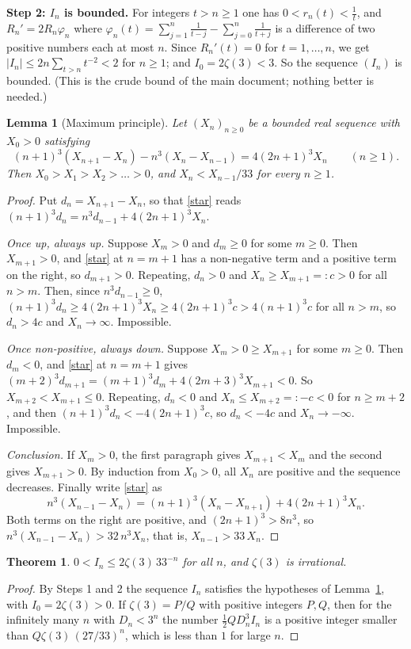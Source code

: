 \documentclass[11pt]{article}
\newtheorem{theorem}{Theorem}
\newtheorem{lemma}{Lemma}
\newcommand{\q}[1]{\medskip\noindent\textbf{#1}}
\begin{document}
\q{Step 2: $I_n$ is bounded.} For integers $t>n\ge1$ one has $0<r_n(t)<\frac1t$, and
$R_n'=2R_n\varphi_n$ where $\varphi_n(t)=\sum_{j=1}^n\frac1{t-j}-\sum_{j=0}^n\frac1{t+j}$ is a
difference of two positive numbers each at most $n$. Since $R_n'(t)=0$ for $t=1,\dots,n$, we get
$|I_n|\le2n\sum_{t>n}t^{-2}<2$ for $n\ge1$; and $I_0=2\zeta(3)<3$. So the sequence $(I_n)$ is
bounded. (This is the crude bound of the main document; nothing better is needed.)

\begin{lemma}[Maximum principle]\label{lem:max}
Let $(X_n)_{n\ge0}$ be a bounded real sequence with $X_0>0$ satisfying
\begin{equation}\label{star}
(n+1)^3(X_{n+1}-X_n)-n^3(X_n-X_{n-1})=4(2n+1)^3X_n\qquad(n\ge1).
\end{equation}
Then $X_0>X_1>X_2>\dots>0$, and $X_n<X_{n-1}/33$ for every $n\ge1$.
\end{lemma}
\begin{proof}
Put $d_n=X_{n+1}-X_n$, so that \eqref{star} reads $(n+1)^3d_n=n^3d_{n-1}+4(2n+1)^3X_n$.

\emph{Once up, always up.} Suppose $X_m>0$ and $d_m\ge0$ for some $m\ge0$. Then $X_{m+1}>0$, and
\eqref{star} at $n=m+1$ has a non-negative term and a positive term on the right, so $d_{m+1}>0$.
Repeating, $d_n>0$ and $X_n\ge X_{m+1}=:c>0$ for all $n>m$. Then, since $n^3d_{n-1}\ge0$,
$(n+1)^3d_n\ge4(2n+1)^3X_n\ge4(2n+1)^3c>4(n+1)^3c$ for all $n>m$, so $d_n>4c$ and $X_n\to\infty$.
Impossible.

\emph{Once non-positive, always down.} Suppose $X_m>0\ge X_{m+1}$ for some $m\ge0$. Then $d_m<0$, and
\eqref{star} at $n=m+1$ gives $(m+2)^3d_{m+1}=(m+1)^3d_m+4(2m+3)^3X_{m+1}<0$. So
$X_{m+2}<X_{m+1}\le0$. Repeating, $d_n<0$ and $X_n\le X_{m+2}=:-c<0$ for $n\ge m+2$, and then
$(n+1)^3d_n<-4(2n+1)^3c$, so $d_n<-4c$ and $X_n\to-\infty$. Impossible.

\emph{Conclusion.} If $X_m>0$, the first paragraph gives $X_{m+1}<X_m$ and the second gives
$X_{m+1}>0$. By induction from $X_0>0$, all $X_n$ are positive and the sequence decreases. Finally
write \eqref{star} as
\[
n^3(X_{n-1}-X_n)=(n+1)^3(X_n-X_{n+1})+4(2n+1)^3X_n .
\]
Both terms on the right are positive, and $(2n+1)^3>8n^3$, so $n^3(X_{n-1}-X_n)>32\,n^3X_n$, that
is, $X_{n-1}>33\,X_n$.
\end{proof}

\begin{theorem}
$0<I_n\le2\zeta(3)\,33^{-n}$ for all $n$, and $\zeta(3)$ is irrational.
\end{theorem}
\begin{proof}
By Steps 1 and 2 the sequence $I_n$ satisfies the hypotheses of Lemma~\ref{lem:max}, with
$I_0=2\zeta(3)>0$. If $\zeta(3)=P/Q$ with positive integers $P,Q$, then for the infinitely many
$n$ with $D_n<3^n$ the number
$\frac12QD_n^3I_n$ is a positive integer smaller than $Q\zeta(3)\,(27/33)^n$, which is less than $1$
for large $n$.
\end{proof}
\end{document}
